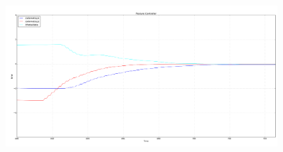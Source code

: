 \documentclass[a4paper,10pt]{article}
\begin{document}
		\begin{figure}[H]
		\centering
		\includegraphics[width=0.9\textwidth]{rover2_rqt_plot93_high_error.png}
		\end{figure}
\end{document}
